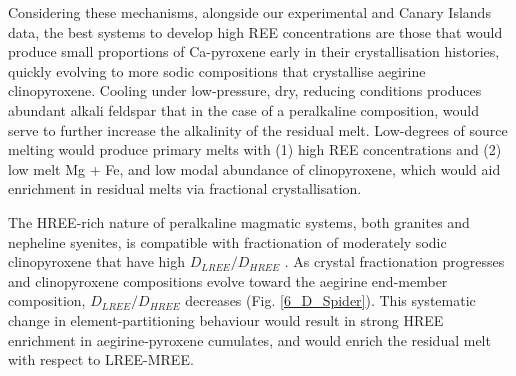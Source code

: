 \documentclass[review,authoryear,12pt]{elsarticle}
\begin{document}
Considering these mechanisms, alongside our experimental and Canary Islands data, the best systems to develop high REE concentrations are those that would produce small proportions of Ca-pyroxene early in their crystallisation histories, quickly evolving to more sodic compositions that crystallise aegirine clinopyroxene. Cooling under low-pressure, dry, reducing conditions produces abundant alkali feldspar that in the case of a peralkaline composition, would serve to further increase the alkalinity of the residual melt.
	Low-degrees of source melting would produce primary melts with (1) high REE concentrations and (2) low melt Mg + Fe, and low modal abundance of clinopyroxene, which would aid enrichment in residual melts via fractional crystallisation.



The HREE-rich nature of peralkaline magmatic systems, both granites and nepheline syenites, is compatible with fractionation of moderately sodic clinopyroxene that have high $D_{LREE}/D_{HREE}$ \citep[e.g.][]{Moller2016, Dostal2017}. As crystal fractionation progresses and clinopyroxene compositions evolve toward the aegirine end-member composition, $D_{LREE}/D_{HREE}$ decreases (Fig. \ref{6_D_Spider}). This systematic change in element-partitioning behaviour would result in strong HREE enrichment in aegirine-pyroxene cumulates, and would enrich the residual melt with respect to LREE-MREE.

\end{document}
